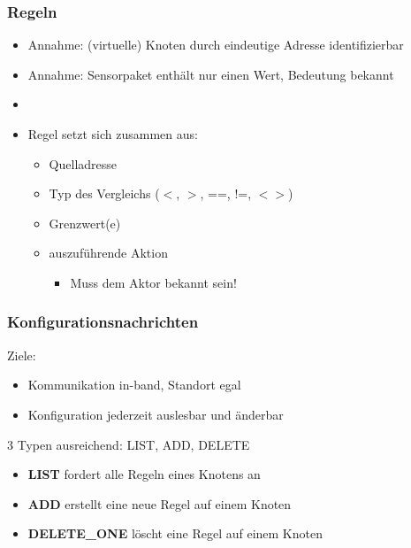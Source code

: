 \documentclass{beamer}
\newcommand{\customitemsep}{7pt}
\begin{document}
\begin{frame}
    \frametitle{Regeln}

    \begin{itemize} \setlength{\itemsep}{\customitemsep}
        \item Annahme: (virtuelle) Knoten durch eindeutige Adresse identifizierbar
        \item Annahme: Sensorpaket enthält nur einen Wert, Bedeutung bekannt
        \item[ ] \vspace*{0.5cm}
            \pause
        \item Regel setzt sich zusammen aus:
        	\begin{itemize}
        		\item Quelladresse
		        \item Typ des Vergleichs ($<$, $>$, ==, !=, $<>$)
		        \item Grenzwert(e)
		        \item auszuführende Aktion
	            \begin{itemize} \setlength{\itemsep}{\customitemsep}
        	        \item Muss dem Aktor bekannt sein!
            	\end{itemize}
        	\end{itemize}
    \end{itemize}
\end{frame}

\begin{frame}
    \frametitle{Konfigurationsnachrichten}

        Ziele:
            \begin{itemize} \setlength{\itemsep}{\customitemsep}
                \item Kommunikation in-band, Standort egal
                \item Konfiguration jederzeit auslesbar und änderbar
            \end{itemize}

            \pause
        \vspace*{1cm}


        3 Typen ausreichend: LIST, ADD, DELETE
            \begin{itemize} \setlength{\itemsep}{\customitemsep}
                \item \textbf{LIST} fordert alle Regeln eines Knotens an
                \item \textbf{ADD} erstellt eine neue Regel auf einem Knoten
                \item \textbf{DELETE\_ONE} löscht eine Regel auf einem Knoten
            \end{itemize}
\end{frame}
\end{document}
